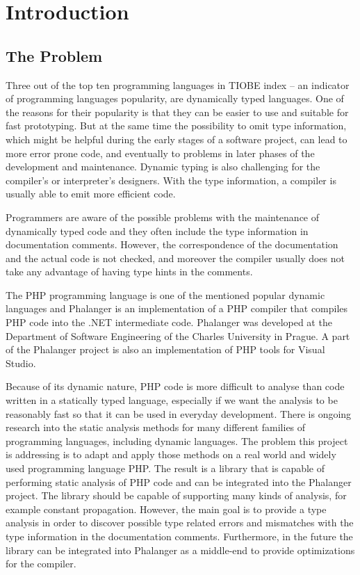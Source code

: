 \chapter{Introduction}

    \section{The Problem}
    
    Three out of the top ten programming languages in TIOBE index\cite{tiobe} -- 
    an indicator of programming languages popularity, are dynamically typed languages. 
    One of the reasons for their popularity is that they can be easier to 
    use and suitable for fast prototyping.
    But at the same time the possibility to omit type information, which might 
    be helpful during the early stages of a software project, can lead to more 
    error prone code, and eventually to problems in later phases of the 
    development and maintenance. Dynamic typing is also challenging for the 
    compiler's or interpreter's designers. With the type information, 
    a compiler is usually able to emit more efficient code.
    
    Programmers are aware of the possible problems with the maintenance of 
    dynamically typed code and they often include the type information in 
    documentation comments. However, the correspondence of the documentation 
    and the actual code is not checked, and moreover the compiler usually 
    does not take any advantage of having type hints in the comments.
    
    The PHP programming language is one of the mentioned popular dynamic 
    languages and Phalanger \cite{benda2006phalanger} is an implementation 
    of a PHP compiler that compiles PHP code into the .NET intermediate code. 
    Phalanger was developed at the Department of Software Engineering 
    of the Charles University in Prague. A part of the Phalanger 
    project is also an implementation of PHP tools for 
    Visual Studio.

    Because of its dynamic nature, PHP code is more difficult to analyse 
    than code written in a statically typed language, especially if we want the 
    analysis to be reasonably fast so that it can be used 
    in everyday development.  There is ongoing research into the 
    static analysis methods for many different families of programming languages, 
    including dynamic languages. The problem this project is addressing 
    is to adapt and apply those methods on a real world and widely 
    used programming language PHP. The result is a library that is capable of 
    performing static analysis of PHP code and can be integrated into 
    the Phalanger project. The library should be capable of supporting many 
    kinds of analysis, for example constant propagation. However, the main goal 
    is to provide a type analysis in order to discover possible type 
    related errors and mismatches with the type information in the 
    documentation comments. Furthermore, in the future the library 
    can be integrated into Phalanger as a middle-end to provide 
    optimizations for the compiler.

